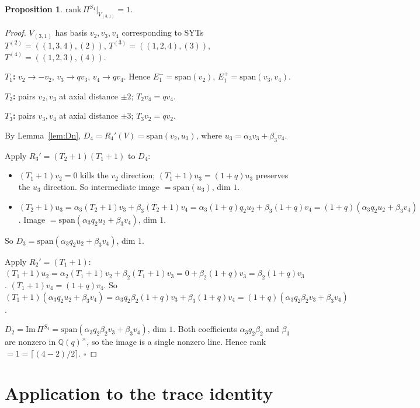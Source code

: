 \documentclass[11pt]{article}
\newtheorem{proposition}[theorem]{Proposition}
\theoremstyle{definition}
\begin{document}
\begin{proposition}\label{prop:n4}
$\mathrm{rank}\,\Pi^{S_4}|_{V_{(3,1)}}=1$.
\end{proposition}

\begin{proof}
$V_{(3,1)}$ has basis $v_2,v_3,v_4$ corresponding to SYTs
$T^{(2)}=((1,3,4),(2))$, $T^{(3)}=((1,2,4),(3))$, $T^{(4)}=((1,2,3),(4))$.

\textbf{$T_1$:} $v_2\to-v_2$, $v_3\to qv_3$, $v_4\to qv_4$. Hence
$E_1^-=\mathrm{span}(v_2)$, $E_1^+=\mathrm{span}(v_3,v_4)$.

\textbf{$T_2$:} pairs $v_2,v_3$ at axial distance $\pm 2$;
$T_2 v_4=qv_4$.

\textbf{$T_3$:} pairs $v_3,v_4$ at axial distance $\pm 3$;
$T_3 v_2=qv_2$.

By Lemma~\ref{lem:Dn}, $D_4=R_4'(V)=\mathrm{span}(v_2,u_3)$, where
$u_3=\alpha_3 v_3+\beta_3 v_4$.

Apply $R_3'=(T_2{+}1)(T_1{+}1)$ to $D_4$:
\begin{itemize}[topsep=0.3em,itemsep=0.2em,leftmargin=2em]
\item $(T_1{+}1)v_2=0$ kills the $v_2$ direction; $(T_1{+}1)u_3=(1+q)u_3$
  preserves the $u_3$ direction. So intermediate image
  $=\mathrm{span}(u_3)$, dim $1$.
\item $(T_2{+}1)u_3=\alpha_3(T_2{+}1)v_3+\beta_3(T_2{+}1)v_4
  =\alpha_3(1+q)q_2 u_2+\beta_3(1+q)v_4
  =(1+q)(\alpha_3 q_2 u_2+\beta_3 v_4)$.
  Image $=\mathrm{span}(\alpha_3 q_2 u_2+\beta_3 v_4)$, dim $1$.
\end{itemize}
So $D_3=\mathrm{span}(\alpha_3 q_2 u_2+\beta_3 v_4)$, dim $1$.

Apply $R_2'=(T_1{+}1)$:
$(T_1{+}1)u_2=\alpha_2(T_1{+}1)v_2+\beta_2(T_1{+}1)v_3=0+\beta_2(1+q)v_3
=\beta_2(1+q)v_3$.
$(T_1{+}1)v_4=(1+q)v_4$.
So $(T_1{+}1)(\alpha_3 q_2 u_2+\beta_3 v_4)=\alpha_3 q_2 \beta_2(1+q)v_3+\beta_3(1+q)v_4
=(1+q)(\alpha_3 q_2\beta_2 v_3+\beta_3 v_4)$.

$D_2=\mathrm{Im}\,\Pi^{S_4}=\mathrm{span}(\alpha_3 q_2\beta_2 v_3+\beta_3 v_4)$,
dim $1$. Both coefficients $\alpha_3 q_2\beta_2$ and $\beta_3$ are
nonzero in $\mathbb{Q}(q)^\times$, so the image is a single nonzero
line. Hence rank $=1=\lceil(4-2)/2\rceil$. $\square$
\end{proof}

\section{Application to the trace identity}\label{sec:application}
\end{document}
